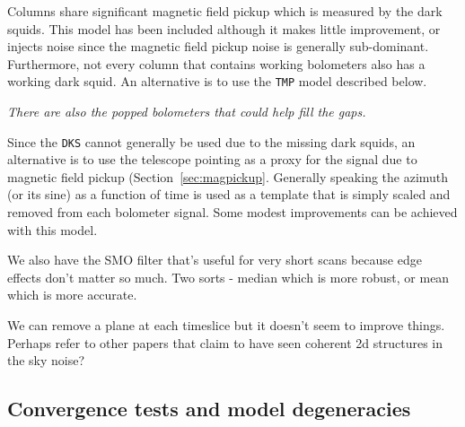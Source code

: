 \documentclass[useAMS,usenatbib,nofootinbib]{mn2e}
\newcommand{\model}[1]{\texttt{#1}}
\begin{document}
Columns share significant magnetic field pickup which is measured by
the dark squids. This model has been included although it makes little
improvement, or injects noise since the magnetic field pickup noise is
generally sub-dominant. Furthermore, not every column that contains
working bolometers also has a working dark squid. An alternative is to
use the \model{TMP} model described below.

\textit{There are also the popped bolometers that could help fill the
gaps.}

Since the \model{DKS} cannot generally be used due to the missing
dark squids, an alternative is to use the telescope pointing as a
proxy for the signal due to magnetic field pickup
(Section~\ref{sec:magpickup}. Generally speaking the azimuth (or its
sine) as a function of time is used as a template that is simply
scaled and removed from each bolometer signal. Some modest
improvements can be achieved with this model.

We also have the SMO filter that's useful for very short scans
because edge effects don't matter so much. Two sorts - median which is
more robust, or mean which is more accurate.

We can remove a plane at each timeslice but it doesn't seem to improve
things. Perhaps refer to other papers that claim to have seen coherent
2d structures in the sky noise?

\subsection{Convergence tests and model degeneracies}
\label{sec:converge}
\end{document}
